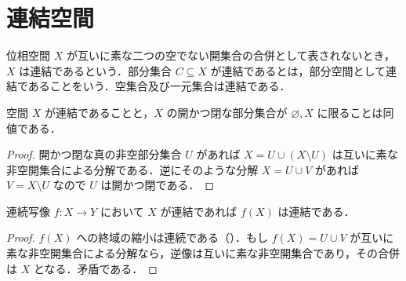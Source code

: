 \section{連結空間}
\begin{defn}[連結空間]
位相空間 $X$ が互いに素な二つの空でない開集合の合併として表されないとき，$X$ は連結であるという．部分集合 $C\subseteq X$ が連結であるとは，部分空間として連結であることをいう．空集合及び一元集合は連結である．
\end{defn}
\begin{prop}[開閉集合による連結性の判定]
空間 $X$ が連結であることと，$X$ の開かつ閉な部分集合が $\varnothing,X$ に限ることは同値である．
\end{prop}
\begin{proof}
開かつ閉な真の非空部分集合 $U$ があれば $X=U\cup(X\setminus U)$ は互いに素な非空開集合による分解である．逆にそのような分解 $X=U\cup V$ があれば $V=X\setminus U$ なので $U$ は開かつ閉である．
\end{proof}
\begin{prop}[連結性の連続像による保存]
連続写像 $f:X\to Y$ において $X$ が連結であれば $f(X)$ は連結である．
\end{prop}
\begin{proof}
$f(X)$ への終域の縮小は連続である（）．もし $f(X)=U\cup V$ が互いに素な非空開集合による分解なら，逆像は互いに素な非空開集合であり，その合併は $X$ となる．矛盾である．
\end{proof}
